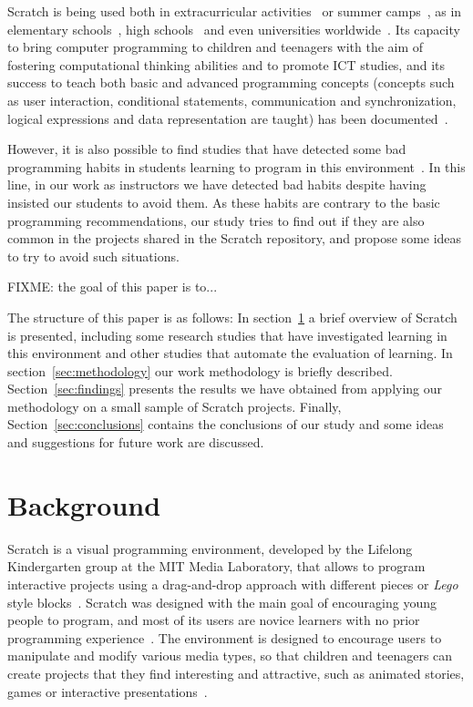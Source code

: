 \documentclass[conference]{format/IEEEtran}
\begin{document}
Scratch is being used both in extracurricular activities~\cite{kafai2010entering} or summer camps~\cite{adams2010scratching}, as in elementary schools~\cite{wilson2012evaluation}, high schools~\cite{meerbaum2013learning} and even universities worldwide~\cite{malan2007scratch}. Its capacity to bring computer programming to children and teenagers with the aim of fostering computational thinking abilities and to promote ICT studies, and its success to teach both basic and advanced programming concepts (concepts such as user interaction, conditional statements, communication and synchronization, logical expressions and data representation are taught) has been documented~\cite{maloney2008programming, franklin2013assessment, wolz2009starting}.

However, it is also possible to find studies that have detected some bad programming habits in students learning to program in this environment~\cite{meerbaum2011habits}. In this line, in our work as instructors we have detected bad habits despite having insisted our students to avoid them. As these habits are contrary to the basic programming recommendations, our study tries to find out if they are also common in the projects shared in the Scratch repository, and propose some ideas to try to avoid such situations.

FIXME: the goal of this paper is to... 

The structure of this paper is as follows: In section~\ref{sec:background} a brief overview of Scratch is presented, including some research studies that have investigated learning in this environment and other studies that automate the evaluation of learning. In section~\ref{sec:methodology} our work methodology is briefly described. Section~\ref{sec:findings} presents the results we have obtained from applying our methodology on a small sample of Scratch projects. Finally, Section~\ref{sec:conclusions} contains the conclusions of our study and some ideas and suggestions for future work are discussed.

\section{Background}
\label{sec:background}

Scratch is a visual programming environment, developed by the Lifelong Kindergarten group at the MIT Media Laboratory, that allows to program interactive projects using a drag-and-drop approach with different pieces or \textit {Lego} style blocks~\cite{resnick2009scratch}. Scratch was designed with the main goal of encouraging young people to program, and most of its users are novice learners with no prior programming experience~\cite{maloney2010scratch}. The environment is designed to encourage users to manipulate and modify various media types, so that children and teenagers can create projects that they find interesting and attractive, such as animated stories, games or interactive presentations~\cite{maloney2008programming}.
\end{document}
